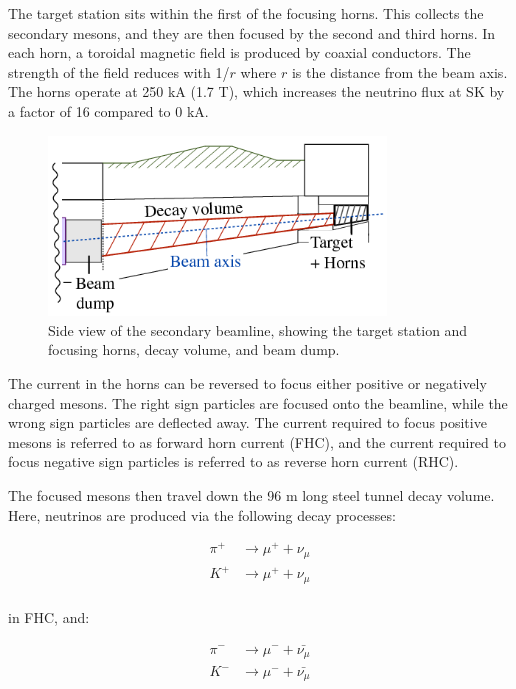 The target station sits within the first of the focusing horns. This collects the secondary mesons, and they are then focused by the second and third horns. In each horn, a toroidal magnetic field is produced by coaxial conductors. The strength of the field reduces with 1/$r$ where $r$ is the distance from the beam axis. The horns operate at 250 kA (1.7 T), which increases the neutrino flux at SK by a factor of 16 compared to 0 kA. 

\begin{figure}[!htbp]
\centering
\includegraphics*[width=0.8\textwidth,clip]{figs/secondarybeamline}
\caption{Side view of the secondary beamline, showing the target station and focusing horns, decay volume, and beam dump.} \label{secondarybeamline}
\end{figure}

The current in the horns can be reversed to focus either positive or negatively charged mesons. The right sign particles are focused onto the beamline, while the wrong sign particles are deflected away. The current required to focus positive mesons is referred to as forward horn current (FHC), and the current required to focus negative sign particles is referred to as reverse horn current (RHC). 

The focused mesons then travel down the 96 m long steel tunnel decay volume. Here, neutrinos are produced via the following decay processes: 

\begin{equation}
 \begin{aligned}
\pi^{+} &\rightarrow \mu^{+} + \nu_{\mu}\\
K^{+} &\rightarrow \mu^{+} + \nu_{\mu}\\
\end{aligned}
\end{equation}

in FHC, and:

\begin{equation}
\begin{aligned}
\pi^{-} &\rightarrow \mu^{-} + \bar{\nu_{\mu}}\\
K^{-} &\rightarrow \mu^{-} + \bar{\nu_{\mu}}\\
 \end{aligned}
\label{eqn:mesondecay}
\end{equation}

